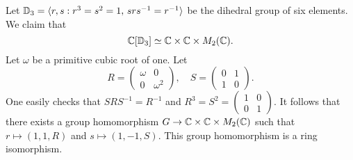 \begin{example}
	Let $\mathbb{D}_3=\langle r,s:r^3=s^2=1,\,srs^{-1}=r^{-1}\rangle$ be the dihedral
	group of six elements. We claim that 
	\[
	\mathbb{C}[\mathbb{D}_3]\simeq\mathbb{C}\times\mathbb{C}\times M_2(\mathbb{C}).
	\]
	Let $\omega$ be a primitive cubic root of one. Let 
	\[
	R=\begin{pmatrix}
		\omega&0\\
		0&\omega^2	
	\end{pmatrix},
	\quad
	S=\begin{pmatrix}
		0&1\\
		1&0
	\end{pmatrix}.
 	\]
 	One easily checks that $SRS^{-1}=R^{-1}$ and $R^3=S^2=\begin{pmatrix}
		1&0\\
		0&1	
	\end{pmatrix}$. It follows that there exists a group homomorphism
	$G\to\mathbb{C}\times\mathbb{C}\times M_2(\mathbb{C})$ such that
	$r\mapsto (1,1,R)$ and $s\mapsto (1,-1,S)$. This group homomorphism
	is a ring isomorphism.  
\end{example}




 